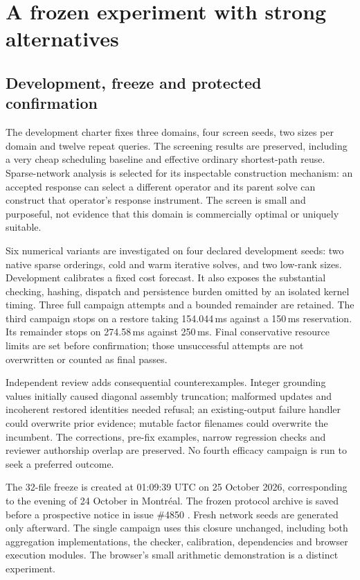 \section{A frozen experiment with strong alternatives}
\label{sec:experiment}

\subsection{Development, freeze and protected confirmation}

The development charter fixes three domains, four screen seeds, two sizes per domain and twelve repeat queries.
The screening results are preserved, including a very cheap scheduling baseline and effective ordinary shortest-path
reuse. Sparse-network analysis is selected for its inspectable construction mechanism: an accepted response can
select a different operator and its parent solve can construct that operator's response instrument. The screen is
small and purposeful, not evidence that this domain is commercially optimal or uniquely suitable.

Six numerical variants are investigated on four declared development seeds: two native sparse orderings,
cold and warm iterative solves, and two low-rank sizes. Development calibrates a fixed cost forecast. It also
exposes the substantial checking, hashing, dispatch and persistence burden omitted by an isolated kernel timing.
Three full campaign attempts and a bounded remainder are retained. The third campaign stops on a restore taking
154.044\,ms against a 150\,ms reservation. Its remainder stops on 274.58\,ms against 250\,ms. Final conservative
resource limits are set before confirmation; those unsuccessful attempts are not overwritten or counted as final passes.

Independent review adds consequential counterexamples. Integer grounding values initially caused diagonal
assembly truncation; malformed updates and incoherent restored identities needed refusal; an existing-output
failure handler could overwrite prior evidence; mutable factor filenames could overwrite the incumbent. The
corrections, pre-fix examples, narrow regression checks and reviewer authorship overlap are preserved. No fourth
efficacy campaign is run to seek a preferred outcome.

The 32-file freeze is created at 01:09:39 UTC on 25 October 2026, corresponding to the evening of 24 October in
Montr\'eal. The frozen protocol archive is saved before a prospective notice in issue \#4850
\citep{earnedFreezeNotice}. Fresh network seeds are generated only afterward. The single campaign uses this
closure unchanged, including both aggregation implementations, the checker, calibration, dependencies and
browser execution modules. The browser's small arithmetic demonstration is a distinct experiment.

